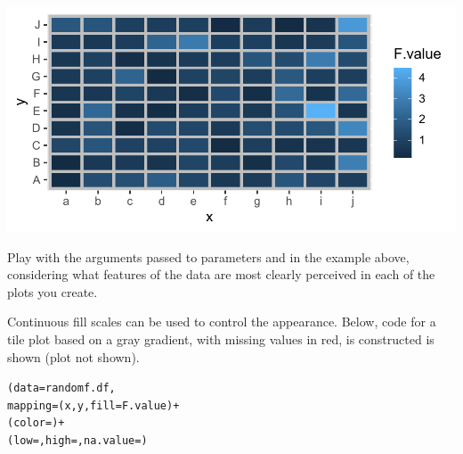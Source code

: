 \documentclass[krantz2]{krantz}\usepackage{knitr}
\begin{document}
\begin{knitrout}\footnotesize
{}\color{fgcolor}\begin{kframe}
\begin{alltt}
\hlstd{(} 
        \hlstd{=}    \hlopt{+}
  \hlstd{(} \hlstd{=} \hlstd{,}  \hlstd{=} \hlstd{)}
\end{alltt}
\end{kframe}

{\centering \includegraphics[width=.7\textwidth]{figure/pos-tile-plot-03-1} 

}


\end{knitrout}

\begin{playground}
Play with the arguments passed to parameters  and  in the example above, considering what features of the data are most clearly perceived in each of the plots you create.
\end{playground}

Continuous fill scales can be used to control the appearance. Below, code for a tile plot based on a gray gradient, with missing values in red, is constructed is shown (plot not shown).

\begin{knitrout}\footnotesize
{}\color{fgcolor}\begin{kframe}
\begin{alltt}
(data = randomf.df,
       mapping = (x, y, fill = F.value) +
  (color = ) +
  (low = , high = , na.value = )
\end{alltt}
\end{kframe}
\end{knitrout}
\end{document}
